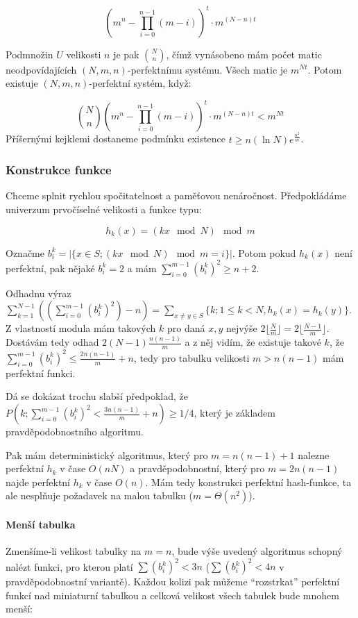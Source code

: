 \documentclass[11pt]{report} %
\numberwithin{equation}{section}
\begin{document}
$$\left(m^n-\prod_{i=0}^{n-1}(m-i)\right)^t\cdot m^{(N-n)t}$$

Podmnožin $U$ velikosti $n$ je pak
$\mathbf{}\binom{N}{n}$, čímž vynásobeno mám počet matic
neodpovídajících $(N,m,n)$-perfektnímu systému. Všech matic je
$m^{Nt}$. Potom existuje $(N,m,n)$-perfektní systém, když:

$$\mathbf{}\binom{N}{n} \left(m^n-\prod_{i=0}^{n-1}(m-i)\right)^t\cdot m^{(N-n)t} < m^{Nt}$$
Příšernými kejklemi dostaneme podmínku existence
$t\geq n(\ln N)e^{\frac{n^2}{m}}$.

\subsubsection{Konstrukce funkce}\label{konstrukce-funkce}

Chceme splnit rychlou spočitatelnost a paměťovou nenáročnost.
Předpokládáme univerzum prvočíselné velikosti a funkce typu:

$$h_k(x)=(kx\mod N)\mod m$$

Označme $b_i^k=|\{x\in S; (kx\mod N)\mod m=i\}|$. Potom pokud
$h_k(x)$ není perfektní, pak nějaké $b_i^k =2$ a mám
$\sum_{i=0}^{m-1}(b_i^k)^2\geq n+2$.

Odhadnu výraz
$\sum_{k=1}^{N-1}((\sum_{i=0}^{m-1}(b_i^k)^2)-n) = \sum_{x\neq y\in S}\{k; 1\leq k<N, h_k(x)=h_k(y)\}$.
Z vlastností modula mám takových $k$ pro daná $x,y$ nejvýše
$2\lfloor\frac{N}{m}\rfloor =2\lfloor\frac{N-1}{m}\rfloor$.
Dostávám tedy odhad $2(N-1)\frac{n(n-1)}{m}$ a z něj vidím, že
existuje takové $k$, že
$\sum_{i=0}^{m-1}(b_i^k)^2\leq \frac{2n(n-1)}{m}+n$, tedy pro
tabulku velikosti $m > n(n-1)$ mám perfektní funkci.

Dá se dokázat trochu slabší předpoklad, že
$P(k;\sum_{i=0}^{m-1}(b_i^k)^2<\frac{3n(n-1)}{m}+n)\geq 1/4$,
který je základem pravděpodobnostního algoritmu.

Pak mám deterministický algoritmus, který pro $m=n(n-1)+1$ nalezne
perfektní $h_k$ v čase $O(nN)$ a pravděpodobnostní, který
pro $m=2n(n-1)$ najde perfektní $h_k$ v čase $O(n)$.
Mám tedy konstrukci perfektní hash-funkce, ta ale nesplňuje požadavek na
malou tabulku ($m=\Theta(n^2)$).

\paragraph{Menší tabulka}\label{menux161uxed-tabulka}

Zmenšíme-li velikost tabulky na $m = n$, bude výše uvedený algoritmus
schopný nalézt funkci, pro kterou platí $\sum (b_i^k)^2 < 3n$
($\sum (b_i^k)^2 < 4n$ v pravděpodobnostní variantě). Každou
kolizi pak můžeme ``rozstrkat'' perfektní funkcí nad miniaturní tabulkou
a celková velikost všech tabulek bude mnohem menší:
\end{document}
